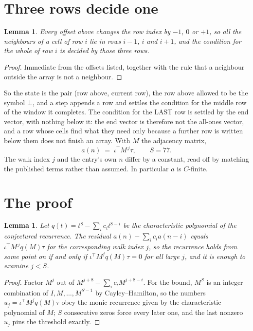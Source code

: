 \documentclass[11pt,a4paper]{article}
\theoremstyle{plain}
\newtheorem{lemma}[theorem]{Lemma}
\theoremstyle{definition}
\begin{document}
\section{Three rows decide one}

\begin{lemma}\label{lem:win}
Every offset above changes the row index by $-1$, $0$ or $+1$, so all the neighbours of a cell
of row $i$ lie in rows $i-1$, $i$ and $i+1$, and the condition for the whole of row $i$ is
decided by those three rows.
\end{lemma}

\begin{proof}
Immediate from the offsets listed, together with the rule that a neighbour outside the array is
not a neighbour.
\end{proof}

So the state is the pair (row above, current row), the row above allowed to be the symbol
$\bot$, and a step appends a row and settles the condition for the middle row of the window it
completes. The condition for the LAST row is settled by the end vector, with nothing below it:
the end vector is therefore not the all-ones vector, and a row whose cells find what they need
only because a further row is written below them does not finish an array. With $M$ the
adjacency matrix,
\[
a(n)\;=\;\iota^{\!\top}M^{\,j}\tau ,\qquad S=77.
\]
The walk index $j$ and the entry's own $n$ differ by a constant, read off by matching the
published terms rather than assumed. In particular $a$ is $C$-finite.

\section{The proof}

\begin{lemma}\label{lem:crit}
Let $q(t)=t^{8}-\sum_i c_it^{8-i}$ be the characteristic polynomial of the
conjectured recurrence. The residual $a(n)-\sum_ic_ia(n-i)$ equals
$\iota^{\!\top}M^{\,j}q(M)\tau$ for the corresponding walk index $j$, so the recurrence
holds from some point on if and only if $\iota^{\!\top}M^{j}q(M)\tau=0$ for all large $j$,
and it is enough to examine $j<S$.
\end{lemma}

\begin{proof}
Factor $M^{j}$ out of $M^{j+8}-\sum_ic_iM^{j+8-i}$. For the bound, $M^{S}$
is an integer combination of $I,M,\dots,M^{S-1}$ by Cayley--Hamilton, so the numbers
$u_j=\iota^{\!\top}M^{j}q(M)\tau$ obey the monic recurrence given by the characteristic
polynomial of $M$; $S$ consecutive zeros force every later one, and the last nonzero $u_j$
pins the threshold exactly.
\end{proof}
\end{document}
